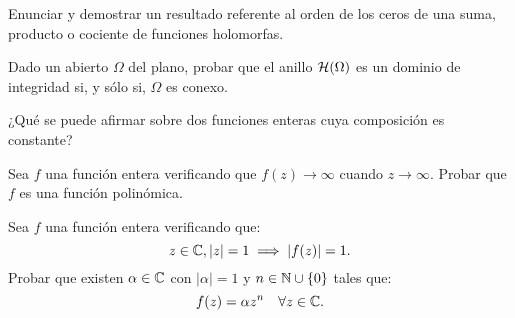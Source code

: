 \begin{ejercicio}
    Enunciar y demostrar un resultado referente al orden de los ceros de una suma, producto o cociente de funciones holomorfas.
\end{ejercicio}

\begin{ejercicio}
    Dado un abierto $\Omega$ del plano, probar que el anillo $\mathcal{H}(\Omega)$ es un dominio de integridad si, y sólo si, $\Omega$ es conexo.
\end{ejercicio}

\begin{ejercicio}
    ¿Qué se puede afirmar sobre dos funciones enteras cuya composición es constante?
\end{ejercicio}

\begin{ejercicio}
    Sea $f$ una función entera verificando que $f(z)\to \infty$ cuando $z\to \infty$. Probar que $f$ es una función polinómica.
\end{ejercicio}

\begin{ejercicio}
    Sea $f$ una función entera verificando que:
    \begin{equation*}
        z\in \mathbb{C}, |z|=1 \implies |f(z)|=1.
    \end{equation*}
    Probar que existen $\alpha\in \mathbb{C}$ con $|\alpha|=1$ y $n\in \mathbb{N}\cup\{0\}$ tales que:
    \begin{equation*}
        f(z)=\alpha z^n \quad \forall z\in \mathbb{C}.
    \end{equation*}
\end{ejercicio}